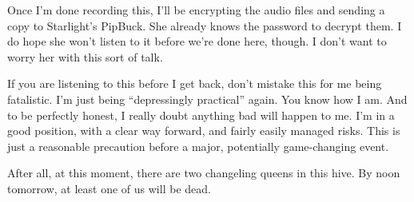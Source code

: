 Once I’m done recording this, I’ll be encrypting the audio files and sending a copy to Starlight’s PipBuck. She already knows the password to decrypt them. I do hope she won’t listen to it before we’re done here, though. I don’t want to worry her with this sort of talk.

If you are listening to this before I get back, don’t mistake this for me being fatalistic. I’m just being “depressingly practical” again. You know how I am. And to be perfectly honest, I really doubt anything bad will happen to me. I’m in a good position, with a clear way forward, and fairly easily managed risks. This is just a reasonable precaution before a major, potentially game-changing event.

After all, at this moment, there are two changeling queens in this hive. By noon tomorrow, at least one of us will be dead.